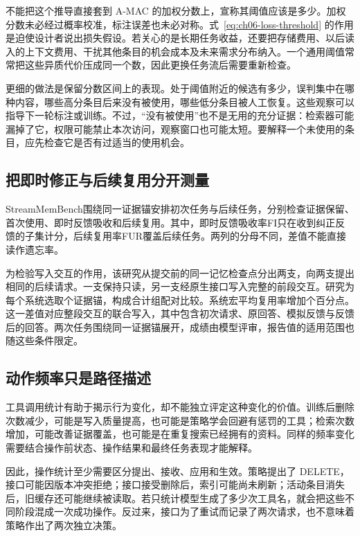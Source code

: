 不能把这个推导直接套到 A-MAC 的加权分数上，宣称其阈值应该是多少。加权分数未必经过概率校准，标注误差也未必对称。式~\eqref{eq:ch06-loss-threshold} 的作用是迫使设计者说出损失假设。若关心的是长期任务收益，还要把存储费用、以后读入的上下文费用、干扰其他条目的机会成本及未来需求分布纳入。一个通用阈值常常把这些异质代价压成同一个数，因此更换任务流后需要重新检查。

更细的做法是保留分数区间上的表现。处于阈值附近的候选有多少，误判集中在哪种内容，哪些高分条目后来没有被使用，哪些低分条目被人工恢复。这些观察可以指导下一轮标注或训练。不过，“没有被使用”也不是无用的充分证据：检索器可能漏掉了它，权限可能禁止本次访问，观察窗口也可能太短。要解释一个未使用的条目，应先检查它是否有过适当的使用机会。

\subsection{把即时修正与后续复用分开测量}

StreamMemBench围绕同一证据锚安排初次任务与后续任务，分别检查证据保留、首次使用、即时反馈吸收和后续复用\cite{streammembench-2026}。其中，即时反馈吸收率FI只在收到纠正反馈的子集计分，后续复用率FUR覆盖后续任务。两列的分母不同，差值不能直接读作遗忘率。

为检验写入交互的作用，该研究从提交前的同一记忆检查点分出两支，向两支提出相同的后续请求。一支保持只读，另一支经原生接口写入完整的前段交互。研究为每个系统选取个证据锚，构成合计组配对比较。系统宏平均复用率增加个百分点\cite{streammembench-2026}。这一差值对应整段交互的联合写入，其中包含初次请求、原回答、模拟反馈与反馈后的回答。两次任务围绕同一证据锚展开，成绩由模型评审，报告值的适用范围也随这些条件限定。

\subsection{动作频率只是路径描述}

工具调用统计有助于揭示行为变化，却不能独立评定这种变化的价值。训练后删除次数减少，可能是写入质量提高，也可能是策略学会回避有惩罚的工具；检索次数增加，可能改善证据覆盖，也可能是在重复搜索已经拥有的资料。同样的频率变化需要结合操作前状态、操作结果和最终任务表现才能解释。

因此，操作统计至少需要区分提出、接收、应用和生效。策略提出了 DELETE，接口可能因版本冲突拒绝；接口接受删除后，索引可能尚未刷新；活动条目消失后，旧缓存还可能继续被读取。若只统计模型生成了多少次工具名，就会把这些不同阶段混成一次成功操作。反过来，接口为了重试而记录了两次请求，也不意味着策略作出了两次独立决策。


